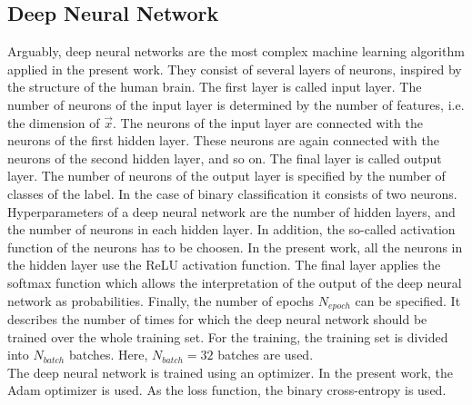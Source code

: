 \subsection{Deep Neural Network}
Arguably, deep neural networks are the most complex machine learning algorithm applied in the present work. They consist of several layers of neurons, inspired by the structure of the human brain. The first layer is called input layer. The number of neurons of the input layer is determined by the number of features, i.e. the dimension of $\vec{x}$. The neurons of the input layer are connected with the neurons of the first hidden layer. These neurons are again connected with the neurons of the second hidden layer, and so on. The final layer is called output layer. The number of neurons of the output layer is specified by the number of classes of the label. In the case of binary classification it consists of two neurons. \\

Hyperparameters of a deep neural network are the number of hidden layers, and the number of neurons in each hidden layer. In addition, the so-called activation function of the neurons has to be choosen. In the present work, all the neurons in the hidden layer use the ReLU activation function. The final layer applies the softmax function which allows the interpretation of the output of the deep neural network as probabilities. Finally, the number of epochs $N_{epoch}$ can be specified. It describes the number of times for which the deep neural network should be trained over the whole training set. For the training, the training set is divided into $N_{batch}$ batches. Here, $N_{batch} = 32$ batches are used. \\

The deep neural network is trained using an optimizer. In the present work, the Adam optimizer is used. As the loss function, the binary cross-entropy is used.

